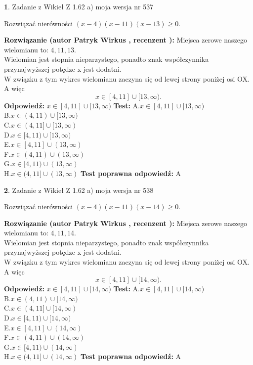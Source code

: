 \documentclass[12pt, a4paper]{article}
\theoremstyle{definition} %
\newtheorem{zad}{}
\newcommand{\zadStart}[1]{\begin{zad}#1\newline}
\newcommand{\zadStop}{\end{zad}}
\newcommand{\rozwStart}[2]{\noindent \textbf{Rozwiązanie (autor #1 , recenzent #2): }\newline}
\newcommand{\rozwStop}{\newline}
\newcommand{\odpStart}{\noindent \textbf{Odpowiedź:}\newline}
\newcommand{\odpStop}{\newline}
\newcommand{\testStart}{\noindent \textbf{Test:}\newline}
\newcommand{\testStop}{\newline}
\newcommand{\kluczStart}{\noindent \textbf{Test poprawna odpowiedź:}\newline}
\newcommand{\kluczStop}{\newline}
\begin{document}
\zadStart{Zadanie z Wikieł Z 1.62 a) moja wersja nr 537}

Rozwiązać nierówności $(x-4)(x-11)(x-13)\ge0$.
\zadStop
\rozwStart{Patryk Wirkus}{}
Miejsca zerowe naszego wielomianu to: $4, 11, 13$.\\
Wielomian jest stopnia nieparzystego, ponadto znak współczynnika przy\linebreak najwyższej potędze x jest dodatni.\\ W związku z tym wykres wielomianu zaczyna się od lewej strony poniżej osi OX. A więc $$x \in [4,11] \cup [13,\infty).$$
\rozwStop
\odpStart
$x \in [4,11] \cup [13,\infty)$
\odpStop
\testStart
A.$x \in [4,11] \cup [13,\infty)$\\
B.$x \in (4,11) \cup [13,\infty)$\\
C.$x \in (4,11] \cup [13,\infty)$\\
D.$x \in [4,11) \cup [13,\infty)$\\
E.$x \in [4,11] \cup (13,\infty)$\\
F.$x \in (4,11) \cup (13,\infty)$\\
G.$x \in [4,11) \cup (13,\infty)$\\
H.$x \in (4,11] \cup (13,\infty)$
\testStop
\kluczStart
A
\kluczStop



\zadStart{Zadanie z Wikieł Z 1.62 a) moja wersja nr 538}

Rozwiązać nierówności $(x-4)(x-11)(x-14)\ge0$.
\zadStop
\rozwStart{Patryk Wirkus}{}
Miejsca zerowe naszego wielomianu to: $4, 11, 14$.\\
Wielomian jest stopnia nieparzystego, ponadto znak współczynnika przy\linebreak najwyższej potędze x jest dodatni.\\ W związku z tym wykres wielomianu zaczyna się od lewej strony poniżej osi OX. A więc $$x \in [4,11] \cup [14,\infty).$$
\rozwStop
\odpStart
$x \in [4,11] \cup [14,\infty)$
\odpStop
\testStart
A.$x \in [4,11] \cup [14,\infty)$\\
B.$x \in (4,11) \cup [14,\infty)$\\
C.$x \in (4,11] \cup [14,\infty)$\\
D.$x \in [4,11) \cup [14,\infty)$\\
E.$x \in [4,11] \cup (14,\infty)$\\
F.$x \in (4,11) \cup (14,\infty)$\\
G.$x \in [4,11) \cup (14,\infty)$\\
H.$x \in (4,11] \cup (14,\infty)$
\testStop
\kluczStart
A
\kluczStop
\end{document}
